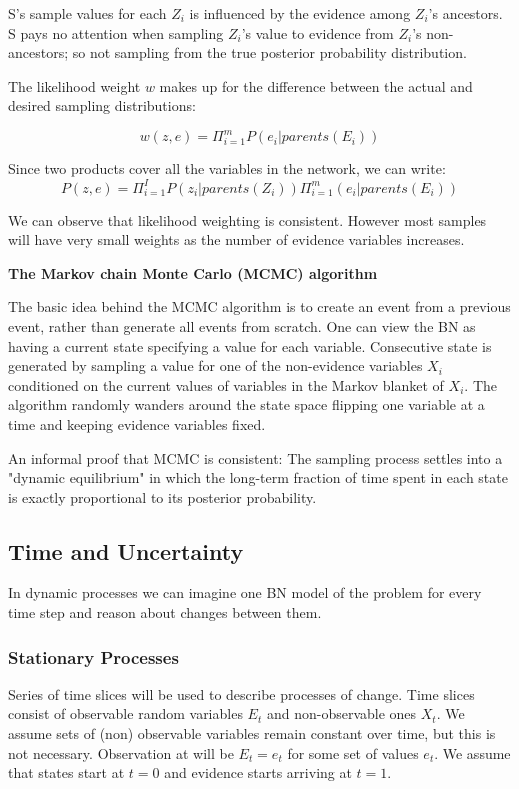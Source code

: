 \documentclass{article}
\begin{document}
 S's sample values for each $Z_i$ is influenced by the evidence among $Z_i$'s ancestors. S pays no attention when sampling $Z_i$'s value to evidence from $Z_i$'s non-ancestors; so not sampling from the true posterior probability distribution.

The likelihood weight $w$ makes up for the difference between the actual and desired sampling distributions: 

$$w(z,e) = \Pi_{i=1}^m P(e_i | parents(E_i))$$

Since two products cover all the variables in the network, we can write: $$P(z,e) = \Pi_{i=1}^I P(z_i |parents(Z_i))\Pi_{i=1}^m(e_i | parents(E_i))$$

We can observe that likelihood weighting is consistent. However most samples will have very small weights as the number of evidence variables increases. 

\textbf{The Markov chain Monte Carlo (MCMC) algorithm} 

The basic idea behind the MCMC algorithm is to create an event from a previous event, rather than generate all events from scratch. One can view the BN as having a current state specifying a value for each variable. Consecutive state is generated by sampling a value for one of the non-evidence variables $X_i$ conditioned on the current values of variables in the Markov blanket of $X_i$. The algorithm randomly wanders around the state space flipping one variable at a time and keeping evidence variables fixed. \newline

An informal proof that MCMC is consistent: The sampling process settles into a "dynamic equilibrium" in which the long-term fraction of time spent in each state is exactly proportional to its posterior probability. 

\subsection{Time and Uncertainty}

In dynamic processes we can imagine one BN model of the problem for every time step and reason about changes between them. 

\subsubsection{Stationary Processes}

Series of time slices will be used to describe processes of change. Time slices consist of observable random variables $E_t$ and non-observable ones $X_t$. We assume sets of (non) observable variables remain constant over time, but this is not necessary. Observation at will be $E_t = e_t$ for some set of values $e_t$. We assume that states start at $t=0$ and evidence starts arriving at $t=1$.
\end{document}
